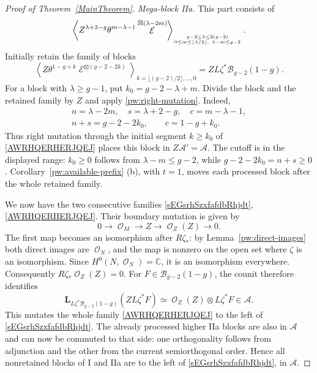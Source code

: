 \documentclass[11pt,letterpaper]{amsart}
\theoremstyle{plain}
\theoremstyle{definition}
\theoremstyle{remark}
\numberwithin{equation}{section}
\DeclareMathOperator{\cE}{\mathcal{E}}
\DeclareMathOperator{\cO}{\mathcal{O}}
\begin{document}
\begin{proof}[Proof of Theorem~\ref{MainTheorem}]
\smallskip
\noindent\textit{Mega-block IIa.}
This part consists of
\begin{equation}\label{sBGASFNADNM}
 \left\langle Z^{\lambda+3-g}\theta^{m-\lambda-1}
              \cE^{\boxtimes(\lambda-2m)}\right\rangle_{{g-2\leq\lambda\leq2(g-2)}\atop
        {0\leq m\leq\lfloor\lambda/2\rfloor,\ \lambda-m\leq g-2}}.
\end{equation}
Initially retain the  family of blocks
\begin{equation}\label{AWRHQERHERJQEJ}
 \left\langle Z\theta^{1-g+k}\cE^{\boxtimes(g-2-2k)}
 \right\rangle_{k=\lfloor(g-2)/2\rfloor,\ldots,0}
       =ZL\zeta^*\mathcal B_{g-2}(1-g).
\end{equation}
For a block with $\lambda\geq g-1$, put
$k_0=g-2-\lambda+m$.  Divide the block and the retained family by
$Z$ and apply \eqref{pw:right-mutation}.  Indeed,
\[
 \begin{gathered}
 n=\lambda-2m,\quad s=\lambda+2-g,\quad c=m-\lambda-1,\\
 n+s=g-2-2k_0,\qquad c=1-g+k_0.
 \end{gathered}
\]
Thus right mutation through the initial segment $k\geq k_0$ of
\eqref{AWRHQERHERJQEJ} places this block in
$Z\mathcal A'=\mathcal A$.  The cutoff is in the displayed range:
$k_0\geq0$ follows from $\lambda-m\leq g-2$, while
$g-2-2k_0=n+s\geq0$.  
Corollary~\ref{pw:available-prefix} (b), with
$t=1$, moves each processed block after the whole retained family.

We now have the two consecutive families
\eqref{sEGsrhSzxfafdbRhjdt}, \eqref{AWRHQERHERJQEJ}.
Their boundary mutation is  given by
\begin{equation}\label{pw:positive-boundary-sequence}
 0\longrightarrow\cO_M\longrightarrow Z
       \longrightarrow\cO_Z(Z)\longrightarrow0.
\end{equation}
The first map becomes an isomorphism after $R\zeta_*$:
by Lemma~\ref{pw:direct-images} both direct images are $\cO_N$,
and the map is nonzero on the open set where $\zeta$ is an
isomorphism.  Since $H^0(N,\cO_N)=\mathbb C$, it is an isomorphism
everywhere.  Consequently $R\zeta_*\cO_Z(Z)=0$.
For $F\in\mathcal B_{g-2}(1-g)$, the counit therefore identifies
\begin{equation}\label{pw:positive-boundary-mutation}
 \mathbf L_{L\zeta^*\mathcal B_{g-2}(1-g)}(ZL\zeta^*F)
       \simeq\cO_Z(Z)\otimes L\zeta^*F\in\mathcal A.
\end{equation}
This mutates the whole family \eqref{AWRHQERHERJQEJ} to the left
of \eqref{sEGsrhSzxfafdbRhjdt}.  The already processed higher IIa
blocks are also in $\mathcal A$ and can now be commuted to that
side: one orthogonality follows from adjunction and the other from
the current semiorthogonal order.  Hence all nonretained blocks of
I and IIa are to the left of \eqref{sEGsrhSzxfafdbRhjdt}, in
$\mathcal A$.


\end{proof}
\end{document}
